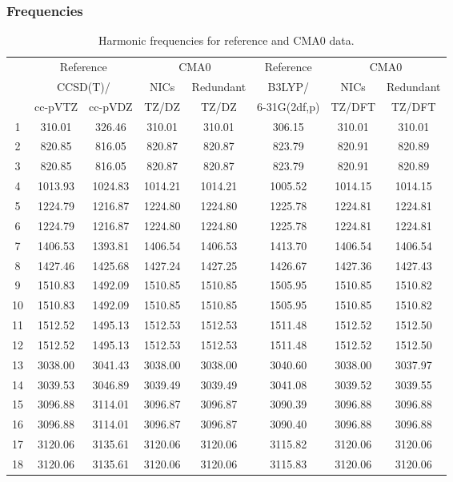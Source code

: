 \documentclass[10pt,oneside]{article}
\begin{document}
\begin{table}[h!]
\subsubsection*{Frequencies}
\centering
\caption{Harmonic frequencies for reference and CMA0 data.}
\begin{tabular}{cccccccc}
\toprule
{} & \multicolumn{2}{c}{Reference} & \multicolumn{2}{c}{CMA0} &    Reference & \multicolumn{2}{c}{CMA0} \\
{} & \multicolumn{2}{c}{CCSD(T)/} &    NICs &  Redundant &       B3LYP/ &    NICs & Redundant \\
{} &   cc-pVTZ & cc-pVDZ &   TZ/DZ &      TZ/DZ & 6-31G(2df,p) &  TZ/DFT &    TZ/DFT \\
\midrule
1  &    310.01 &  326.46 &  310.01 &     310.01 &       306.15 &  310.01 &    310.01 \\
2  &    820.85 &  816.05 &  820.87 &     820.87 &       823.79 &  820.91 &    820.89 \\
3  &    820.85 &  816.05 &  820.87 &     820.87 &       823.79 &  820.91 &    820.89 \\
4  &   1013.93 & 1024.83 & 1014.21 &    1014.21 &      1005.52 & 1014.15 &   1014.15 \\
5  &   1224.79 & 1216.87 & 1224.80 &    1224.80 &      1225.78 & 1224.81 &   1224.81 \\
6  &   1224.79 & 1216.87 & 1224.80 &    1224.80 &      1225.78 & 1224.81 &   1224.81 \\
7  &   1406.53 & 1393.81 & 1406.54 &    1406.53 &      1413.70 & 1406.54 &   1406.54 \\
8  &   1427.46 & 1425.68 & 1427.24 &    1427.25 &      1426.67 & 1427.36 &   1427.43 \\
9  &   1510.83 & 1492.09 & 1510.85 &    1510.85 &      1505.95 & 1510.85 &   1510.82 \\
10 &   1510.83 & 1492.09 & 1510.85 &    1510.85 &      1505.95 & 1510.85 &   1510.82 \\
11 &   1512.52 & 1495.13 & 1512.53 &    1512.53 &      1511.48 & 1512.52 &   1512.50 \\
12 &   1512.52 & 1495.13 & 1512.53 &    1512.53 &      1511.48 & 1512.52 &   1512.50 \\
13 &   3038.00 & 3041.43 & 3038.00 &    3038.00 &      3040.60 & 3038.00 &   3037.97 \\
14 &   3039.53 & 3046.89 & 3039.49 &    3039.49 &      3041.08 & 3039.52 &   3039.55 \\
15 &   3096.88 & 3114.01 & 3096.87 &    3096.87 &      3090.39 & 3096.88 &   3096.88 \\
16 &   3096.88 & 3114.01 & 3096.87 &    3096.87 &      3090.40 & 3096.88 &   3096.88 \\
17 &   3120.06 & 3135.61 & 3120.06 &    3120.06 &      3115.82 & 3120.06 &   3120.06 \\
18 &   3120.06 & 3135.61 & 3120.06 &    3120.06 &      3115.83 & 3120.06 &   3120.06 \\
\bottomrule
\end{tabular}
\end{table}
\end{document}
